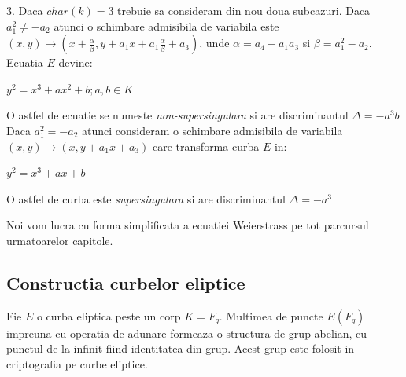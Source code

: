 \begin{dfn}
3. Daca $char(k) = 3$ trebuie sa consideram din nou doua subcazuri. Daca $a_1^2 \neq -a_2$ atunci o schimbare admisibila de variabila este
$(x, y) \rightarrow (x + \frac{\alpha}{\beta}, y + a_1x + a_1\frac{\alpha}{\beta} + a_3)$, unde $\alpha = a_4 -a_1a_3$ si $\beta = a_1^2 - a_2$. Ecuatia $E$ devine: 
\begin{center} $y^2 = x^3 + ax^2 + b; a, b\in K$\end{center}
O astfel de ecuatie se numeste \textit{non-supersingulara} si are discriminantul $\Delta = -a^3b$ \\
Daca $a_1^2 = -a_2$ atunci consideram o schimbare admisibila de variabila $(x, y) \rightarrow (x, y + a_1x + a_3)$ care transforma curba $E$ in:
\begin{center} $y^2 = x^3 + ax + b$ \end{center}
O astfel de curba este \textit{supersingulara} si are discriminantul $\Delta = -a^3$
\end{dfn}

\begin{obs}
Noi vom lucra cu forma simplificata a ecuatiei Weierstrass pe tot parcursul urmatoarelor capitole.
\end{obs}

\subsection{Constructia curbelor eliptice}
\label{subsec:subsec01}

\begin{dfn}
Fie $E$ o curba eliptica peste un corp $K = F_q$. Multimea de puncte $E(F_q)$ impreuna cu operatia de adunare formeaza o structura de grup abelian, cu punctul de la infinit fiind identitatea din grup. Acest grup este folosit in criptografia pe curbe eliptice.
\end{dfn}

